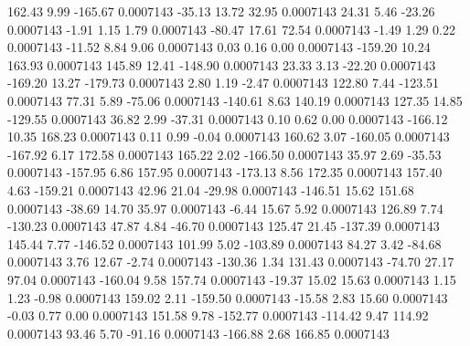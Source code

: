       162.43        9.99     -165.67     0.0007143
      -35.13       13.72       32.95     0.0007143
       24.31        5.46      -23.26     0.0007143
       -1.91        1.15        1.79     0.0007143
      -80.47       17.61       72.54     0.0007143
       -1.49        1.29        0.22     0.0007143
      -11.52        8.84        9.06     0.0007143
        0.03        0.16        0.00     0.0007143
     -159.20       10.24      163.93     0.0007143
      145.89       12.41     -148.90     0.0007143
       23.33        3.13      -22.20     0.0007143
     -169.20       13.27     -179.73     0.0007143
        2.80        1.19       -2.47     0.0007143
      122.80        7.44     -123.51     0.0007143
       77.31        5.89      -75.06     0.0007143
     -140.61        8.63      140.19     0.0007143
      127.35       14.85     -129.55     0.0007143
       36.82        2.99      -37.31     0.0007143
        0.10        0.62        0.00     0.0007143
     -166.12       10.35      168.23     0.0007143
        0.11        0.99       -0.04     0.0007143
      160.62        3.07     -160.05     0.0007143
     -167.92        6.17      172.58     0.0007143
      165.22        2.02     -166.50     0.0007143
       35.97        2.69      -35.53     0.0007143
     -157.95        6.86      157.95     0.0007143
     -173.13        8.56      172.35     0.0007143
      157.40        4.63     -159.21     0.0007143
       42.96       21.04      -29.98     0.0007143
     -146.51       15.62      151.68     0.0007143
      -38.69       14.70       35.97     0.0007143
       -6.44       15.67        5.92     0.0007143
      126.89        7.74     -130.23     0.0007143
       47.87        4.84      -46.70     0.0007143
      125.47       21.45     -137.39     0.0007143
      145.44        7.77     -146.52     0.0007143
      101.99        5.02     -103.89     0.0007143
       84.27        3.42      -84.68     0.0007143
        3.76       12.67       -2.74     0.0007143
     -130.36        1.34      131.43     0.0007143
      -74.70       27.17       97.04     0.0007143
     -160.04        9.58      157.74     0.0007143
      -19.37       15.02       15.63     0.0007143
        1.15        1.23       -0.98     0.0007143
      159.02        2.11     -159.50     0.0007143
      -15.58        2.83       15.60     0.0007143
       -0.03        0.77        0.00     0.0007143
      151.58        9.78     -152.77     0.0007143
     -114.42        9.47      114.92     0.0007143
       93.46        5.70      -91.16     0.0007143
     -166.88        2.68      166.85     0.0007143
